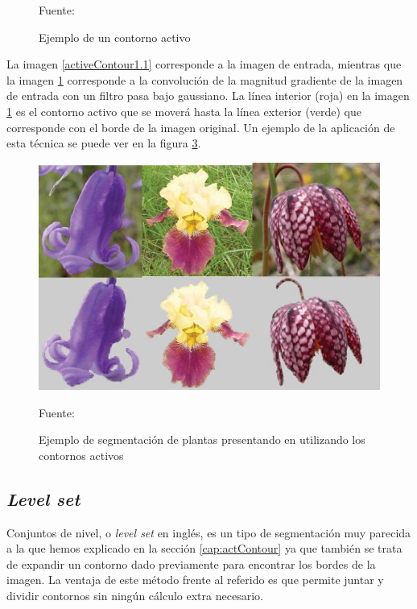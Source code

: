 \begin{figure}[H]
\begin{subfigure}[t]{2.5in}
		\subcaption{}\label{activeContour1.2}
	\end{subfigure}
	\caption{Ejemplo de un contorno activo}
	\vspace{2 mm}
	Fuente: \cite{eri2015}
	\label{activeContour1}
\end{figure}

La imagen \ref{activeContour1.1} corresponde a la imagen de entrada, mientras que la imagen \ref{activeContour1.2} corresponde a la convoluci\'{o}n de la magnitud gradiente de la imagen de entrada con un filtro pasa bajo gaussiano. La l\'{i}nea interior (roja) en la imagen \ref{activeContour1.2} es el contorno activo que se mover\'{a} hasta la l\'{i}nea exterior (verde) que corresponde con el borde de la imagen original. Un ejemplo de la aplicaci\'{o}n de esta t\'{e}cnica se puede ver en la figura \ref{activeContour2}.

\begin{figure}[H]
	\captionsetup{justification=centering}	
	\centering
	\includegraphics[width=.8\textwidth]{./imagenes/activeContour2}
	\caption{Ejemplo de segmentaci\'{o}n de plantas presentando en \cite{suta1} utilizando los contornos activos}
	\vspace{2 mm}
	Fuente: \cite{suta1}	
	\label{activeContour2}
\end{figure}


\subsection{\textit{Level set}}\label{levelSet}
Conjuntos de nivel, o \textit{level set} en ingl\'{e}s, es un tipo de segmentaci\'{o}n muy parecida a la que hemos explicado en la secci\'{o}n \ref{cap:actContour} ya que tambi\'{e}n se trata de expandir un contorno dado previamente para encontrar los bordes de la imagen. La ventaja de este m\'{e}todo frente al referido es que permite juntar y dividir contornos sin ning\'{u}n c\'{a}lculo extra necesario.

